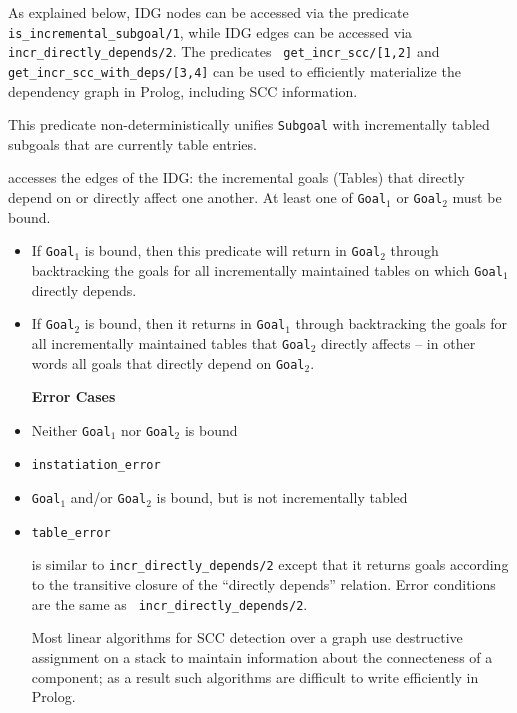 As explained below, IDG nodes can be accessed via the predicate {\tt
  is\_incremental\_subgoal/1}, while IDG edges can be accessed via
{\tt incr\_directly\_depends/2}.  The predicates {\tt
  get\_incr\_scc/[1,2]} and {\tt get\_incr\_scc\_with\_deps/[3,4]} can
be used to efficiently materialize the dependency graph in Prolog,
including SCC information.

\begin{description}

%
This predicate non-deterministically unifies {\tt Subgoal} with
incrementally tabled subgoals that are currently table entries.

accesses the edges of the IDG: the incremental goals (Tables) that
directly depend on or directly affect one another.  At least one of
{\tt Goal$_1$} or {\tt Goal$_2$} must be bound.
\begin{itemize}
\item If {\tt Goal$_1$} is bound, then this predicate will return in
  {\tt Goal$_2$} through backtracking the goals for all incrementally
  maintained tables on which {\tt Goal$_1$} directly depends.
\item If {\tt Goal$_2$} is bound, then it returns in {\tt Goal$_1$}
  through backtracking the goals for all incrementally maintained
  tables that {\tt Goal$_2$} directly affects -- in other words all
  goals that directly depend on {\tt Goal$_2$}.  \ei

{\bf Error Cases}
\bi
\item Neither {\tt Goal$_1$} nor {\tt Goal$_2$} is bound 
\bi
\item 	{\tt instatiation\_error}
\ei
\item {\tt Goal$_1$} and/or {\tt Goal$_2$} is bound, but is not
  incrementally tabled
\bi
\item 	{\tt table\_error}
\ei
\ei

is similar to {\tt incr\_directly\_depends/2} except that it returns
goals according to the transitive closure of the ``directly depends''
relation.  Error conditions are the same as {\tt
  incr\_directly\_depends/2}.

%
Most linear algorithms for SCC detection over a graph use destructive
assignment on a stack to maintain information about the connecteness
of a component; as a result such algorithms are
difficult to write efficiently in Prolog.


\end{itemize}
\end{description}
